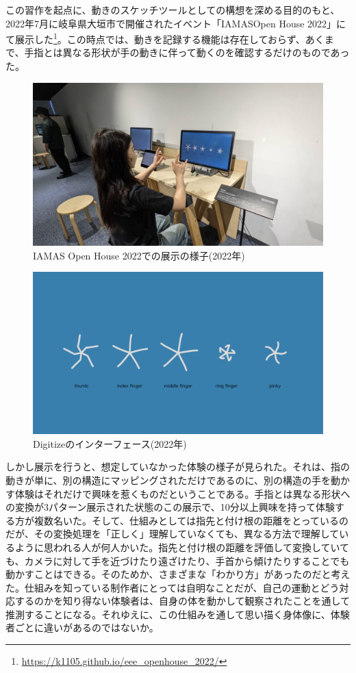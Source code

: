 この習作を起点に、動きのスケッチツールとしての構想を深める目的のもと、2022年7月に岐阜県大垣市で開催されたイベント「IAMASOpen House 2022」にて展示した\footnote{\url{https://k1105.github.io/eee_openhouse_2022/}}。この時点では、動きを記録する機能は存在しておらず、あくまで、手指とは異なる形状が手の動きに伴って動くのを確認するだけのものであった。

\begin{figure}[H]
  \centering
  \includegraphics[width=15cm]{img/openhouse2022.jpeg}
  \caption{IAMAS Open House 2022での展示の様子(2022年)}
  \label{fig:exhibit_2022}
\end{figure}

\begin{figure}[H]
  \centering
  \includegraphics[width=15cm]{img/openhouse2022_interface.png}
  \caption{Digitizeのインターフェース(2022年)}
  \label{fig:exhibit_2022_interface}
\end{figure}

しかし展示を行うと、想定していなかった体験の様子が見られた。それは、指の動きが単に、別の構造にマッピングされただけであるのに、別の構造の手を動かす体験はそれだけで興味を惹くものだということである。手指とは異なる形状への変換が3パターン展示された状態のこの展示で、10分以上興味を持って体験する方が複数名いた。そして、仕組みとしては指先と付け根の距離をとっているのだが、その変換処理を「正しく」理解していなくても、異なる方法で理解しているように思われる人が何人かいた。指先と付け根の距離を評価して変換していても、カメラに対して手を近づけたり遠ざけたり、手首から傾けたりすることでも動かすことはできる。そのためか、さまざまな「わかり方」があったのだと考えた。仕組みを知っている制作者にとっては自明なことだが、自己の運動とどう対応するのかを知り得ない体験者は、自身の体を動かして観察されたことを通して推測することになる。それゆえに、この仕組みを通して思い描く身体像に、体験者ごとに違いがあるのではないか。

